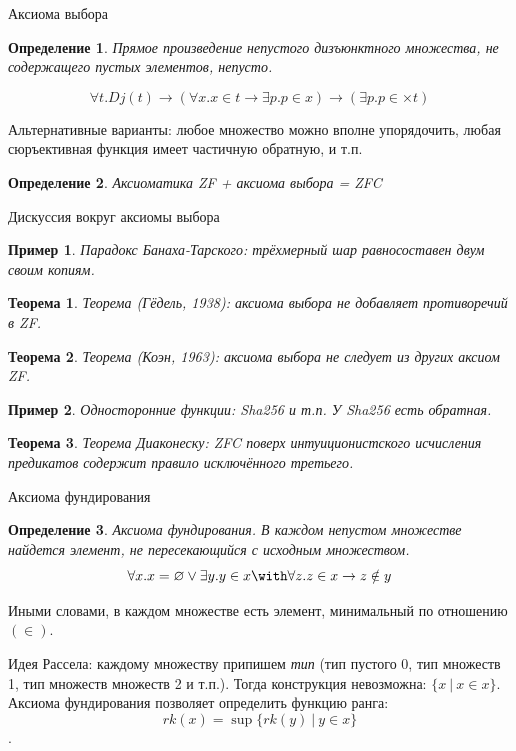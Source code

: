 \documentclass[aspectratio=169]{beamer}
\newtheorem{thm}{Теорема}[section]
\newtheorem{dfn}{Определение}[section]
\newtheorem{exm}{Пример}[section]
\begin{document}
\begin{frame}{Аксиома выбора}
\begin{dfn}
Прямое произведение непустого дизъюнктного множества, 
не содержащего пустых элементов, непусто.

$$\forall t.Dj (t) \rightarrow 
(\forall x.x \in t \rightarrow \exists p.p \in x) \rightarrow
(\exists p.p \in \times t)$$
\end{dfn}\pause

Альтернативные варианты: любое множество можно вполне упорядочить, \pause любая сюръективная функция имеет частичную обратную, 
и т.п.
\begin{dfn}Аксиоматика ZF + аксиома выбора = ZFC\end{dfn}\pause
\end{frame}

\begin{frame}{Дискуссия вокруг аксиомы выбора}
\begin{exm}Парадокс Банаха-Тарского: трёхмерный шар равносоставен двум своим копиям.\end{exm}\pause
\begin{thm}Теорема (Гёдель, 1938): аксиома выбора не добавляет противоречий в ZF.\end{thm}\pause
\begin{thm}Теорема (Коэн, 1963): аксиома выбора не следует из других аксиом ZF.\end{thm}\pause
\begin{exm}Односторонние функции: Sha256 и т.п. У Sha256 есть обратная.\end{exm}\pause
\begin{thm}Теорема Диаконеску: ZFC поверх интуиционистского исчисления предикатов содержит правило исключённого третьего.\end{thm}
\end{frame}

\begin{frame}{Аксиома фундирования}
\begin{dfn}Аксиома фундирования. 
В каждом непустом множестве найдется элемент, не пересекающийся с исходным множеством.
$$\forall x .x = \varnothing \vee \exists y .y \in x \with \forall z.z \in x \rightarrow z \notin y$$
\end{dfn}

Иными словами, в каждом множестве есть элемент, минимальный по отношению $(\in)$.

Идея Рассела: каждому множеству припишем \emph{тип} (тип пустого 0, тип множеств 1,
тип множеств множеств 2 и т.п.). Тогда конструкция невозможна: $\{ x\ |\ x \in x\}$.
Аксиома фундирования позволяет определить функцию ранга:
$$rk(x) = \sup\{rk(y)\ |\ y\in x\}$$.
\end{frame}
\end{document}
